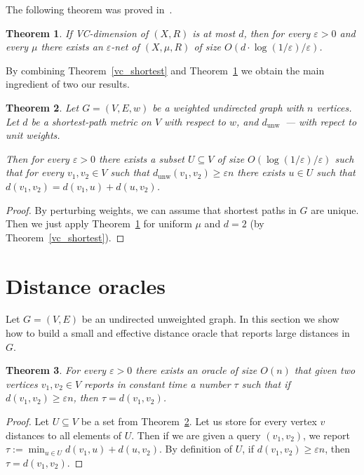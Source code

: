 \documentclass{article}
\newcommand{\dunw}{d_{\mathrm{unw}}}
\newcommand{\eps}{\varepsilon}
\newtheorem{theorem}{Theorem}
\begin{document}
    The following theorem was proved in~\cite{HW86}.

    \begin{theorem}
        \label{eps_nets}
        If VC-dimension of $(X, R)$ is at most $d$, then for every $\eps > 0$ and every $\mu$ there exists an $\eps$-net of $(X, \mu, R)$ of size 
        $O(d \cdot \log(1 / \eps) / \eps)$.
    \end{theorem}

    By combining Theorem~\ref{vc_shortest} and Theorem~\ref{eps_nets} we obtain the main ingredient of two our results.

    \begin{theorem}
        \label{hitting_set}
        Let $G = (V, E, w)$ be a weighted undirected graph with $n$ vertices.
        Let $d$ be a shortest-path metric on $V$ with respect to $w$, and $\dunw$~--- with repect to unit weights.

        Then for every $\eps > 0$ there exists a subset $U \subseteq V$ of size $O(\log(1 / \eps) / \eps)$
        such that for every $v_1, v_2 \in V$ such that $\dunw(v_1, v_2) \geq \eps n$
        there exists $u \in U$ such that $d(v_1, v_2) = d(v_1, u) + d(u, v_2)$.
    \end{theorem}
    \begin{proof}
        By perturbing weights, we can assume that shortest paths in $G$ are unique. Then we just apply Theorem~\ref{eps_nets} for uniform $\mu$
        and $d = 2$ (by Theorem~\ref{vc_shortest}).
    \end{proof}

    \section{Distance oracles}
    \label{data_structure}

    Let $G = (V, E)$ be an undirected unweighted graph. In this section we show how to build a small and effective distance oracle 
    that reports large distances in $G$.

    \begin{theorem}
        \label{simple_oracle}
        For every $\eps > 0$
        there exists an oracle of size $O(n)$ that given two vertices $v_1, v_2 \in V$ reports in constant time
        a number $\tau$ such that if $d(v_1, v_2) \geq \eps n$, then
        $\tau = d(v_1, v_2)$.
    \end{theorem}
    \begin{proof}
        Let $U \subseteq V$ be a set from Theorem~\ref{hitting_set}.
        Let us store for every vertex $v$ distances to all elements of $U$.
        Then if we are given a query $(v_1, v_2)$, we report $\tau := \min_{u \in U} d(v_1, u) + d(u, v_2)$. By definition of $U$, if $d(v_1, v_2) \geq \eps n$,
        then $\tau = d(v_1, v_2)$.
    \end{proof}
\end{document}
